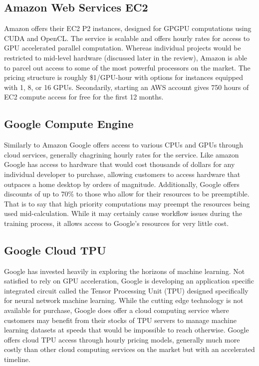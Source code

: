 \documentclass[onecolumn, draftclsnofoot,10pt, compsoc]{IEEEtran}
\begin{document}
    \subsection{Amazon Web Services EC2}
    Amazon offers their EC2 P2 instances, designed for GPGPU computations using CUDA and OpenCL. The service is scalable and offers hourly rates for access to GPU accelerated parallel computation. Whereas individual projects would be restricted to mid-level hardware (discussed later in the review), Amazon is able to parcel out access to some of the most powerful processors on the market. The pricing structure is roughly \$1/GPU-hour with options for instances equipped with 1, 8, or 16 GPUs. Secondarily, starting an AWS account gives 750 hours of EC2 compute access for free for the first 12 months.
    \subsection{Google Compute Engine}
    Similarly to Amazon Google offers access to various CPUs and GPUs through cloud services, generally chagrining hourly rates for the service. Like amazon Google has access to hardware that would cost thousands of dollars for any individual developer to purchase, allowing customers to access hardware that outpaces a home desktop by orders of magnitude. Additionally, Google offers discounts of up to 70\% to those who allow for their resources to be preemptible. That is to say that high priority computations may preempt the resources being used mid-calculation. While it may certainly cause workflow issues during the training process, it allows access to Google’s resources for very little cost.
    \subsection{Google Cloud TPU}
    Google has invested heavily in exploring the horizons of machine learning. Not satisfied to rely on GPU acceleration, Google is developing an application specific integrated circuit called the Tensor Processing Unit (TPU) designed specifically for neural network machine learning. While the cutting edge technology is not available for purchase, Google does offer a cloud computing service where customers may benefit from their stocks of TPU servers to manage machine learning datasets at speeds that would be impossible to reach otherwise. Google offers cloud TPU access through hourly pricing models, generally much more costly than other cloud computing services on the market but with an accelerated timeline.
    
\end{document}
